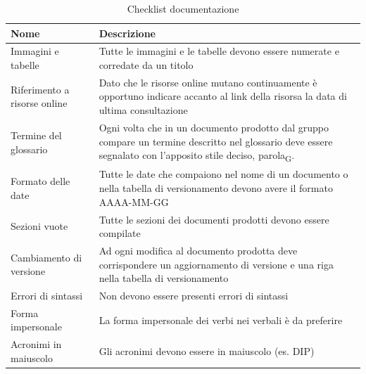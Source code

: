 \documentclass[a4paper,12pt]{article}
\begin{document}
                \begin{longtable}{|M{3.5cm}|M{8.5cm}|}

                    \caption{Checklist documentazione} \\
                    \hline
                    \textbf{Nome} & \textbf{Descrizione} \\
                    \hline
                    \endhead

                    Immagini e tabelle & Tutte le immagini e le tabelle devono essere numerate e corredate da un titolo \\
                    \hline

                    Riferimento a risorse online & Dato che le risorse online mutano continuamente è opportuno indicare accanto al link della risorsa la data di ultima consultazione \\
                    \hline

                    Termine del glossario & Ogni volta che in un documento prodotto dal gruppo compare un termine descritto nel glossario deve essere segnalato con l’apposito stile deciso, parola\textsubscript{G}.\\
                    \hline

                    Formato delle date & Tutte le date che compaiono nel nome di un documento o nella tabella di versionamento devono avere il formato AAAA-MM-GG \\
                    \hline

                    Sezioni vuote & Tutte le sezioni dei documenti prodotti devono essere compilate \\
                    \hline

                    Cambiamento di versione & Ad ogni modifica al documento prodotta deve corrispondere un aggiornamento di versione e una riga nella tabella di versionamento \\
                    \hline

                    Errori di sintassi & Non devono essere presenti errori di sintassi \\
                    \hline

                    Forma impersonale & La forma impersonale dei verbi nei verbali è da preferire \\
                    \hline

                    Acronimi in maiuscolo & Gli acronimi devono essere in maiuscolo (es. DIP) \\
                    \hline


\end{longtable}
\end{document}
